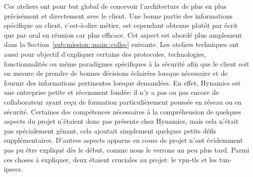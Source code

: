 \documentclass[12pt, oneside, a4paper, titlepage]{report}
\begin{document}
Ces ateliers ont pour but global de concevoir l'architecture de plus en plus
précisément et directement avec le client. Une bonne partie des informations
spécifique au client, c'est-à-dire métier, est cependant obtenue plutôt par
écrit que par oral en réunion car plus efficace.  Cet aspect est abordé plus
amplement dans la Section~\ref{sub:mission::main::collec} suivante. Les ateliers
techniques ont aussi pour objectif d'expliquer certains des protocoles,
technologies, fonctionnalités ou même paradigmes spécifiques à la sécurité afin
que le client soit en mesure de prendre de bonnes décisions éclairées lorsque
nécessaire et de fournir des informations pertinentes lorsque demandées. En
effet, Hynamics est une entreprise petite et récemment fondée: il n'y a pas ou
pas encore de collaborateur ayant reçu de formation particulièrement poussée en
réseau ou en sécurité. Certaines des compétences nécessaires à la compréhension
de quelques aspects du projet n'étaient donc pas présente chez Hynamics, mais
cela n'était pas spécialement gênant, cela ajoutait simplement quelques petits
défis supplémentaires. D'autres aspects apparus en cours de projet n'ont
évidemment pas pu être expliqué dès le début, comme nous le verrons un peu plus
tard. Parmi ces choses à expliquer, deux étaient cruciales au projet: le
\gls{vpn-tls} et les \glspl{tun-ipsec}.
\end{document}
